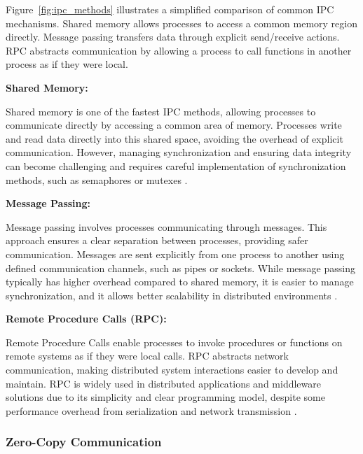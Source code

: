 \vspace{1em}
\newpage
Figure~\ref{fig:ipc_methods} illustrates a simplified comparison of common IPC mechanisms. Shared memory allows processes to access a common memory region directly. Message passing transfers data through explicit send/receive actions. RPC abstracts communication by allowing a process to call functions in another process as if they were local.

\vspace{1em}
\textbf{Shared Memory:}

Shared memory is one of the fastest IPC methods, allowing processes to communicate directly by accessing a common area of memory. Processes write and read data directly into this shared space, avoiding the overhead of explicit communication. However, managing synchronization and ensuring data integrity can become challenging and requires careful implementation of synchronization methods, such as semaphores or mutexes \cite{stallings2018, ipc_performance_analysis}.

\vspace{1em}
\textbf{Message Passing:}

\vspace{0.4em}
Message passing involves processes communicating through messages. This approach ensures a clear separation between processes, providing safer communication. Messages are sent explicitly from one process to another using defined communication channels, such as pipes or sockets. While message passing typically has higher overhead compared to shared memory, it is easier to manage synchronization, and it allows better scalability in distributed environments \cite{tanenbaum2015}.

\vspace{1em}
\textbf{Remote Procedure Calls (RPC):}

\vspace{0.4em}
Remote Procedure Calls enable processes to invoke procedures or functions on remote systems as if they were local calls. RPC abstracts network communication, making distributed system interactions easier to develop and maintain. RPC is widely used in distributed applications and middleware solutions due to its simplicity and clear programming model, despite some performance overhead from serialization and network transmission \cite{coulouris2012}.

\subsubsection{Zero-Copy Communication}

